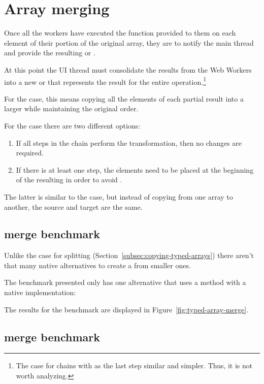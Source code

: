 \section{Array merging}

Once all the workers have executed the function provided to them on each element of their portion of the original array, they are to notify the main thread and provide the resulting \tabuffer{} or \tsabuffer{}.

At this point the UI thread must consolidate the results from the Web Workers into a new \ttarray{} or \tstarray{} that represents the result for the entire operation.\footnote{The case for chains with  as the last step similar and simpler. Thus, it is not worth analyzing.}

For the \tabuffer{} case, this means copying all the elements of each partial result into a larger \ttarray{} while maintaining the original order.

For the \tsabuffer{} case there are two different options:
\begin{enumerate}
  \item If all steps in the chain perform the  transformation, then no changes are required.
  \item If there is at least one  step, the elements need to be placed at the beginning of the resulting \tstarray{} in order to avoid .
\end{enumerate}

The latter is similar to the \tabuffer{} case, but instead of copying from one array to another, the source and target are the same.

\subsection{\ttarray{} merge benchmark}
Unlike the case for \ttarray{} splitting (Section~\ref{subsec:copying-typed-arrays}) there aren't that many native alternatives to create a \ttarray{} from smaller ones.

The benchmark presented only has one alternative that uses a method with a native implementation:

The results for the benchmark are displayed in Figure~\ref{fig:typed-array-merge}.

\subsection{\tstarray{} merge benchmark}

